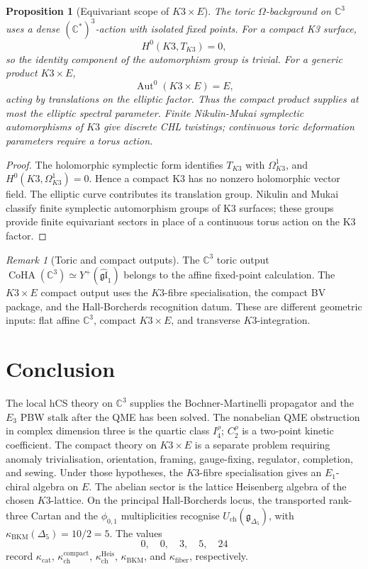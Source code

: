 \documentclass[11pt]{amsart}
\providecommand{\C}{\mathbb{C}}
\providecommand{\CoHA}{\operatorname{CoHA}}
\providecommand{\Eone}{E_1}
\providecommand{\Yp}{Y^{+}}
\providecommand{\frakgDelta}{\mathfrak{g}_{\Delta_5}}
\providecommand{\kchc}{\kappa_{\mathrm{ch}}^{\mathrm{compact}}}
\providecommand{\kchH}{\kappa_{\mathrm{ch}}^{\mathrm{Heis}}}
\providecommand{\kcat}{\kappa_{\mathrm{cat}}}
\providecommand{\kBKM}{\kappa_{\mathrm{BKM}}}
\providecommand{\kfib}{\kappa_{\mathrm{fiber}}}
\theoremstyle{plain}
\newtheorem{proposition}[theorem]{Proposition}
\theoremstyle{definition}
\theoremstyle{remark}
\newtheorem{remark}[theorem]{Remark}
\begin{document}
\begin{proposition}[Equivariant scope of \(K3\times E\)]
\label{prop:equivariant-scope}
The toric \(\Omega\)-background on \(\C^3\) uses a dense
\((\C^\ast)^3\)-action with isolated fixed points.  For a compact K3
surface,
\[
  H^0(K3,T_{K3})=0,
\]
so the identity component of the automorphism group is trivial.  For a
generic product \(K3\times E\),
\[
  \operatorname{Aut}^0(K3\times E)=E,
\]
acting by translations on the elliptic factor.  Thus the compact product
supplies at most the elliptic spectral parameter.  Finite Nikulin-Mukai
symplectic automorphisms of \(K3\) give discrete CHL twistings; continuous
toric deformation parameters require a torus action.
\end{proposition}

\begin{proof}
The holomorphic symplectic form identifies \(T_{K3}\) with
\(\Omega^1_{K3}\), and \(H^0(K3,\Omega^1_{K3})=0\).  Hence a compact
K3 has no nonzero holomorphic vector field.  The elliptic curve
contributes its translation group.  Nikulin and Mukai classify finite
symplectic automorphism groups of K3 surfaces; these groups provide
finite equivariant sectors in place of a continuous torus action on the
K3 factor.
\end{proof}

\begin{remark}[Toric and compact outputs]
\label{rem:toric-compact-outputs}
The \(\C^3\) toric output
\(\CoHA(\C^3)\simeq\Yp(\widehat{\mathfrak{gl}}_1)\) belongs to the
affine fixed-point calculation.  The \(K3\times E\) compact output uses
the \(K3\)-fibre specialisation, the compact BV package, and the
Hall-Borcherds recognition datum.  These are different geometric
inputs: flat affine \(\C^3\), compact \(K3\times E\), and transverse
\(K3\)-integration.
\end{remark}

\section{Conclusion}
\label{sec:conclusion}

The local hCS theory on \(\C^3\) supplies the Bochner-Martinelli
propagator and the \(E_3\) PBW stalk after the QME has been solved.
The nonabelian QME obstruction in complex dimension three is the
quartic class \(I_4^\rho\); \(C_2^\rho\) is a two-point kinetic
coefficient.  The compact theory on \(K3\times E\) is a separate
problem requiring anomaly trivialisation, orientation, framing,
gauge-fixing, regulator, completion, and sewing.  Under those
hypotheses, the \(K3\)-fibre specialisation gives an \(\Eone\)-chiral
algebra on \(E\).  The abelian sector is the lattice Heisenberg algebra
of the chosen \(K3\)-lattice.  On the principal Hall-Borcherds locus,
the transported rank-three Cartan and the \(\phi_{0,1}\) multiplicities
recognise \(U_{\mathrm{ch}}(\frakgDelta)\), with
\(\kBKM(\Delta_5)=10/2=5\).  The values
\[
  0,\quad 0,\quad 3,\quad 5,\quad 24
\]
record \(\kcat\), \(\kchc\), \(\kchH\), \(\kBKM\), and \(\kfib\),
respectively.
\end{document}
